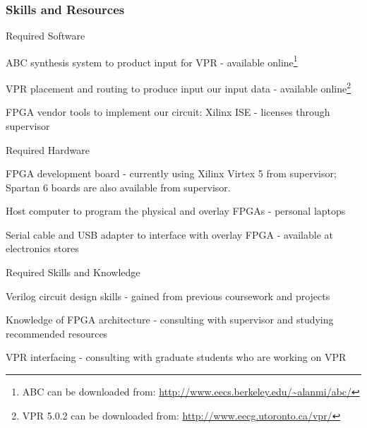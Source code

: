 \subsubsection{Skills and Resources}

\begin{itemlist}
	\item Required Software \
		\begin{itemlist}
			\item ABC synthesis system to product input for VPR - available online\footnote{ABC can be downloaded from: \url{http://www.eecs.berkeley.edu/~alanmi/abc/}}
			\item VPR placement and routing to produce input our input data - available online\footnote{VPR 5.0.2 can be downloaded from: \url{http://www.eecg.utoronto.ca/vpr/}}
			\item FPGA vendor tools to implement our circuit: Xilinx ISE - licenses through supervisor
		\end{itemlist}
	\item Required Hardware \
		\begin{itemlist}
			\item FPGA development board - currently using Xilinx Virtex 5 from supervisor; Spartan 6 boards are also available from supervisor.
			\item Host computer to program the physical and overlay FPGAs - personal laptops
			\item Serial cable and USB adapter to interface with overlay FPGA - available at electronics stores
		\end{itemlist}
	\item Required Skills and Knowledge \
		\begin{itemlist}
			\item Verilog circuit design skills - gained from previous coursework and projects
			\item Knowledge of FPGA architecture - consulting with supervisor and studying recommended resources
			\item VPR interfacing - consulting with graduate students who are working on VPR
		\end{itemlist}
\end{itemlist}



